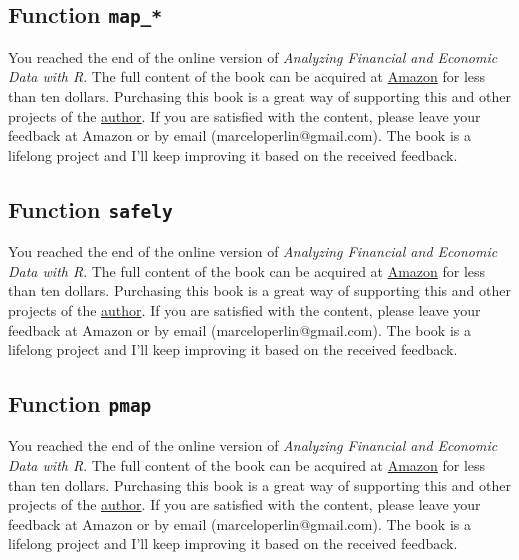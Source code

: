 \documentclass[
  12pt,
]{book}
\newenvironment{pleasebuyit}
{\begin{noteblock}
		
	} {\end{noteblock}}
\begin{document}
\hypertarget{function-map_}{%
\subsection{\texorpdfstring{Function \texttt{map\_*}}{Function map\_*}}\label{function-map_}}

\begin{pleasebuyit}
You reached the end of the online version of \emph{Analyzing Financial
and Economic Data with R}. The full content of the book can be acquired
at \href{https://www.amazon.com/dp/B084LSNXMN}{Amazon} for less than ten
dollars. Purchasing this book is a great way of supporting this and
other projects of the \href{https://www.msperlin.com/}{author}. If you
are satisfied with the content, please leave your feedback at Amazon or
by email (marceloperlin@gmail.com). The book is a lifelong project and
I'll keep improving it based on the received feedback.
\end{pleasebuyit}

\hypertarget{function-safely}{%
\subsection{\texorpdfstring{Function \texttt{safely}}{Function safely}}\label{function-safely}}

\begin{pleasebuyit}
You reached the end of the online version of \emph{Analyzing Financial
and Economic Data with R}. The full content of the book can be acquired
at \href{https://www.amazon.com/dp/B084LSNXMN}{Amazon} for less than ten
dollars. Purchasing this book is a great way of supporting this and
other projects of the \href{https://www.msperlin.com/}{author}. If you
are satisfied with the content, please leave your feedback at Amazon or
by email (marceloperlin@gmail.com). The book is a lifelong project and
I'll keep improving it based on the received feedback.
\end{pleasebuyit}

\hypertarget{function-pmap}{%
\subsection{\texorpdfstring{Function \texttt{pmap}}{Function pmap}}\label{function-pmap}}

\begin{pleasebuyit}
You reached the end of the online version of \emph{Analyzing Financial
and Economic Data with R}. The full content of the book can be acquired
at \href{https://www.amazon.com/dp/B084LSNXMN}{Amazon} for less than ten
dollars. Purchasing this book is a great way of supporting this and
other projects of the \href{https://www.msperlin.com/}{author}. If you
are satisfied with the content, please leave your feedback at Amazon or
by email (marceloperlin@gmail.com). The book is a lifelong project and
I'll keep improving it based on the received feedback.
\end{pleasebuyit}
\end{document}
